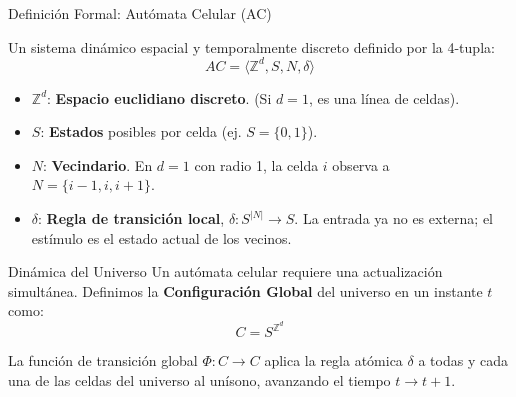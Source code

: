 \documentclass[10pt, aspectratio=169]{beamer}
\begin{document}
\begin{frame}{Definición Formal: Autómata Celular (AC)}
    \vspace{0.2cm}
    
        Un sistema dinámico espacial y temporalmente discreto definido por la 4-tupla:
        $$AC = \langle \mathbb{Z}^d, S, N, \delta \rangle$$
   

    \vspace{0.2cm}
    \begin{itemize}
        \item $\mathbb{Z}^d$: \textbf{Espacio euclidiano discreto}. (Si $d=1$, es una línea de celdas).
        \item $S$: \textbf{Estados} posibles por celda (ej. $S = \{0, 1\}$).
        \item $N$: \textbf{Vecindario}. En $d=1$ con radio 1, la celda $i$ observa a $N = \{i-1, i, i+1\}$.
        \item $\delta$: \textbf{Regla de transición local}, $\delta: S^{|N|} \to S$. La entrada ya no es externa; el estímulo es el estado actual de los vecinos.
    \end{itemize}
\end{frame}

\begin{frame}{Dinámica del Universo}
    \normalsize
    Un autómata celular requiere una actualización simultánea. Definimos la \textbf{Configuración Global} del universo en un instante $t$ como:
    $$C = S^{\mathbb{Z}^d}$$
    
    \vspace{0.6cm}
    La función de transición global $\Phi: C \to C$ aplica la regla atómica $\delta$ a todas y cada una de las celdas del universo al unísono, avanzando el tiempo $t \to t+1$.
\end{frame}

\end{document}
